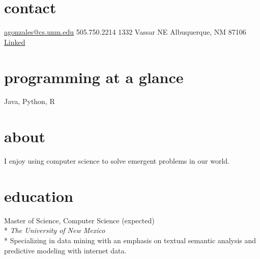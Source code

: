 \documentclass[]{friggeri-cv} %
\begin{document}


\begin{aside} %
\section{contact}
\href{mailto:agonzales@cs.unm.edu}{agonzales@cs.unm.edu}
505.750.2214
1332 Vassar NE
Albuquerque, NM 87106
\href{http://lnkd.in/b8kfQSe}{Linked\scriptsize{\faLinkedin}}
~
\section{programming at a glance}
{\thinfont Java, Python, R}
~
\section{about}
I enjoy using computer science to solve emergent problems in our world.
\end{aside}



\thispagestyle{empty}
\section{education}
\begin{description}
  \item {\largeheaderfont Master of Science, Computer Science}  \hfill 
    { (expected)} \\*
    {\footnotesize \emph{The University of New Mexico  }} \\*
Specializing in data mining with an emphasis on textual semantic analysis
and predictive modeling with internet data.
\end{description}
\end{document}
